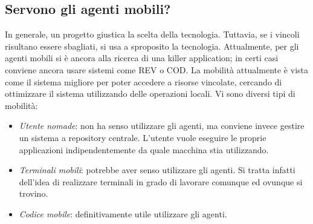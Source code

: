 \subsection{Servono gli agenti mobili?}
In generale, un progetto giustica la scelta della tecnologia. Tuttavia, se i vincoli risultano essere sbagliati, si usa 
a sproposito la tecnologia.
Attualmente, per gli agenti mobili si è ancora alla ricerca di una killer application; in certi casi conviene ancora 
usare sistemi come REV o COD. La mobilità attualmente è vista come il sistema migliore per poter accedere a risorse 
vincolate, cercando di ottimizzare il sistema utilizzando delle operazioni locali. Vi sono diversi tipi di mobilità:
\begin{itemize}
 \item \textit{Utente nomade}: non ha senso utilizzare gli agenti, ma conviene invece gestire un sistema a repository 
centrale.  L'utente vuole eseguire le proprie applicazioni indipendentemente da quale macchina stia utilizzando.
 \item \textit{Terminali mobili}: potrebbe aver senso utilizzare gli agenti. Si tratta infatti dell'idea di realizzare
 terminali in grado di lavorare comunque ed ovunque si trovino.
 \item \textit{Codice mobile}: definitivamente utile utilizzare gli agenti.
\end{itemize}
